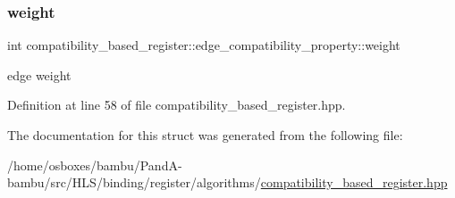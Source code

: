 \subsubsection{\texorpdfstring{weight}{weight}}
{\footnotesize\ttfamily int compatibility\+\_\+based\+\_\+register\+::edge\+\_\+compatibility\+\_\+property\+::weight}



edge weight 



Definition at line 58 of file compatibility\+\_\+based\+\_\+register.\+hpp.



The documentation for this struct was generated from the following file\+:\begin{DoxyCompactItemize}
\item 
/home/osboxes/bambu/\+Pand\+A-\/bambu/src/\+H\+L\+S/binding/register/algorithms/\hyperlink{compatibility__based__register_8hpp}{compatibility\+\_\+based\+\_\+register.\+hpp}\end{DoxyCompactItemize}
